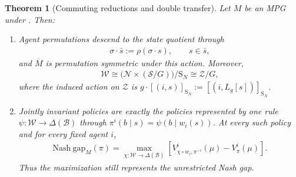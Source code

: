 \documentclass{article}
\theoremstyle{plain}
\newtheorem{theorem}{Theorem}
\theoremstyle{definition}
\theoremstyle{remark}
\newcommand{\Nash}{\mathrm{Nash\ gap}}
\newcommand{\N}{\mathcal{N}}
\newcommand{\St}{\mathcal{S}}
\newcommand{\orbit}[1]{[#1]}
\newcommand{\quotient}[1]{\overline{#1}}
\newcommand{\Sym}{\mathrm{S}}
\begin{document}
\begin{theorem}[Commuting reductions and double transfer]
\label{thm:combined-reductions}
Let $M$ be an MPG under
. Then:
\begin{enumerate}[label=\arabic*.,leftmargin=2.0em,itemsep=2pt,topsep=2pt]
  \item Agent permutations descend to the state quotient through
  \begin{align*}
    \sigma\mathbin{\cdot}\bar s
    :=
    \rho(\sigma\mathbin{\cdot}s),
    \qquad s\in\bar s,
  \end{align*}
  and $\quotient M$ is permutation symmetric under this action. Moreover,
  \begin{align}
    \mathcal W
    \cong
    \big(\N\times(\St/G)\big)/\Sym_N
    \cong
    \mathcal Z/G,
    \label{eq:combined-orbit-isomorphism}
  \end{align}
  where the induced action on $\mathcal Z$ is
  $g\mathbin{\cdot}\orbit{(i,s)}_{\Sym_N}
  :=\orbit{(i,L_g[s])}_{\Sym_N}$.

  \item Jointly invariant policies are exactly the policies represented by one
  rule $\psi:\mathcal W\to\Delta(\mathcal B)$ through
  $\pi^i(b\mid s)=\psi(b\mid w_i(s))$. At every such policy and for every
  fixed agent $i$,
  \begin{align}
    \Nash_M(\pi)
    =
    \max_{\chi:\mathcal W\to\Delta(\mathcal B)}
    \left[
      V^i_{\chi\circ w_i,\pi^{-i}}(\mu)
      -
      V^i_\pi(\mu)
    \right].
    \label{eq:combined-nash-reduction}
  \end{align}
  Thus the maximization still represents the unrestricted Nash gap.


\end{enumerate}
\end{theorem}
\end{document}
